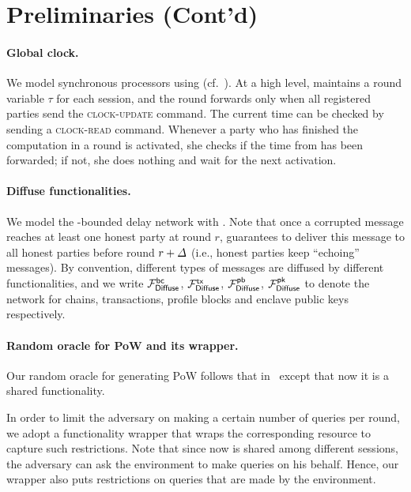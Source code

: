 \section{Preliminaries (Cont'd)}
\label{sec:preliminaries-contd}

\paragraph{Global clock.}
%
We model synchronous processors using \funcClock (cf.~\cite{TCC:KMTZ13}).
%
At a high level, \funcClock maintains a round variable $\tau$ for each session, and the round forwards only when all registered parties send \funcClock the \textsc{clock-update} command.
%
The current time can be checked by sending a \textsc{clock-read} command.
%
Whenever a party who has finished the computation in a round is activated, she checks if the time from \funcClock has been forwarded; if not, she does nothing and wait for the next activation.



\paragraph{Diffuse functionalities.}
%
We model the \delay-bounded delay network with \funcDiffuse \cite{C:BMTZ17}.
%
Note that once a corrupted message reaches at least one honest party at round $r$, \funcDiffuse guarantees to deliver this message to all honest parties before round $r + \varDelta$ (i.e., honest parties keep ``echoing'' messages).
%
By convention, different types of messages are diffused by different functionalities, and we write $\mathcal{F}_{\mathsf{Diffuse}}^{\mathsf{bc}}$, $\mathcal{F}_{\mathsf{Diffuse}}^{\mathsf{tx}}$, $\mathcal{F}_{\mathsf{Diffuse}}^{\mathsf{pb}}$, $\mathcal{F}_{\mathsf{Diffuse}}^\mathsf{pk}$ to denote the network for chains, transactions, profile blocks and enclave public keys respectively.



\paragraph{Random oracle for PoW and its wrapper.}
%
Our random oracle for generating PoW follows that in~\cite{C:BMTZ17} except that now it is a shared functionality.



In order to limit the adversary on making a certain number of queries per round, we adopt a functionality wrapper \cite{C:BMTZ17} that wraps the corresponding resource to capture such restrictions.
%
Note that since now \funcGRO is shared among different sessions, the adversary can ask the environment to make queries on his behalf.
%
Hence, our wrapper \wrapper{\funcGRO} also puts restrictions on queries that are made by the environment.

